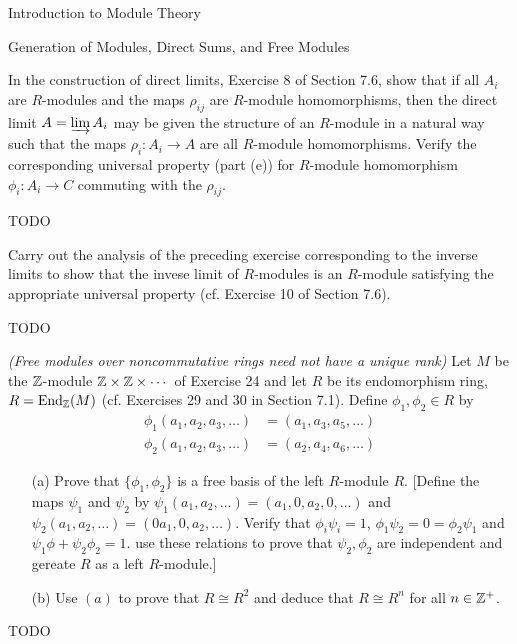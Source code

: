 \begin{chapter}{Introduction to Module Theory}
\begin{section}{Generation of Modules, Direct Sums, and Free Modules}
\begin{solution}
\end{solution}\oneperpage



\begin{problem}\label{ex:10.3.25}
In the construction of direct limits, Exercise 8 of Section 7.6, show that if all $A_i$ are $R$-modules and the maps $\rho_{ij}$ are $R$-module homomorphisms, then the direct limit $A=\varinjlim A_i$ may be given the structure of an $R$-module in a natural way such that the maps $\rho_i:A_i\to A$ are all $R$-module homomorphisms. Verify the corresponding universal property (part (e)) for $R$-module homomorphism $\phi_i:A_i\to C$ commuting with the $\rho_{ij}$. 
\end{problem}
\begin{solution}TODO

\end{solution}\oneperpage



\begin{problem}\label{ex:10.3.26}
Carry out the analysis of the preceding exercise corresponding to the inverse limits to show that the invese limit of $R$-modules is an $R$-module satisfying the appropriate universal property (cf. Exercise 10 of Section 7.6).
\end{problem}
\begin{solution}TODO

\end{solution}\oneperpage



\begin{problem}\label{ex:10.3.27}
\emph{(Free modules over noncommutative rings need not have a unique rank)} Let $M$ be the $\mathbb{Z}$-module $\mathbb{Z}\times \mathbb{Z}\times \cdots$ of Exercise 24 and let $R$ be its endomorphism ring, $R = \operatorname{End}_{\mathbb{Z}}(M)$ (cf. Exercises 29 and 30 in Section 7.1). Define $\phi_1,\phi_2\in R$ by \begin{align*}
\phi_1(a_1,a_2,a_3,\ldots)&=(a_1,a_3,a_5,\ldots)\\
\phi_2(a_1,a_2,a_3,\ldots)&=(a_2,a_4,a_6,\ldots)
\end{align*}
\begin{enumerate}
\item[(a)] Prove that $\{\phi_1,\phi_2\}$ is a free basis of the left $R$-module $R$. [Define the maps $\psi_1$ and $\psi_2$ by $\psi_1(a_1,a_2,\ldots) =(a_1,0,a_2,0,\ldots)$ and $\psi_2(a_1,a_2,\ldots) =(0a_1,0,a_2,\ldots)$. Verify that $\phi_i\psi_i = 1$, $\phi_1\psi_2 = 0 = \phi_2\psi_1$ and $\psi_1\phi+\psi_2\phi_2 = 1$. use these relations to prove that $\psi_2,\phi_2$ are independent and gereate $R$ as a left $R$-module.]
\item[(b)] Use $(a)$ to prove that $R\cong R^2$ and deduce that $R\cong R^n$ for all $n\in \mathbb{Z}^+$.
\end{enumerate}
\end{problem}
\begin{solution}TODO


\end{solution}
\end{section}
\end{chapter}
